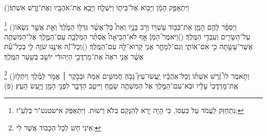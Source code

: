 \documentclass[12pt, openany]{book}
\newcommand{\footnotecomment}[1]{
	\renewcommand\thefootnote{}
	\footnote{\textsf{#1}}}
\newcommand{\commenta}[1]{\footnotecomment{#1}\hspace{0em}}
\newcommand{\vsnum}[1]{(\hebrewnumeral{#1})\space}
\begin{document}
{\vsnum{10}וַיִּתְאַפַּ֣ק הָמָ֔ן וַיָּב֖וֹא אֶל־בֵּית֑וֹ וַיִּשְׁלַ֛ח וַיָּבֵ֥א אֶת־אֹהֲבָ֖יו וְאֶת־זֶ֥רֶשׁ אִשְׁתּֽוֹ׃%
\commenta{ נִתְחַזֵּק לַעֲמֹד עַל כַּעְסוֹ, כִּי הָיָה יָרֵא לְהִנָּקֵם בְּלֹא רְשׁוּת. וַיִּתְאַפַּק אישטנט"ר בְּלַעַ"ז: }%
\vsnum{11}וַיְסַפֵּ֨ר לָהֶ֥ם הָמָ֛ן אֶת־כְּב֥וֹד עָשְׁר֖וֹ וְרֹ֣ב בָּנָ֑יו וְאֵת֩ כָּל־אֲשֶׁ֨ר גִּדְּל֤וֹ הַמֶּ֙לֶךְ֙ וְאֵ֣ת אֲשֶׁ֣ר נִשְּׂא֔וֹ עַל־הַשָּׂרִ֖ים וְעַבְדֵ֥י הַמֶּֽלֶךְ׃
\vsnum{12}וַיֹּאמֶר֮ הָמָן֒ אַ֣ף לֹא־הֵבִיאָה֩ אֶסְתֵּ֨ר הַמַּלְכָּ֧ה עִם־הַמֶּ֛לֶךְ אֶל־הַמִּשְׁתֶּ֥ה אֲשֶׁר־עָשָׂ֖תָה כִּ֣י אִם־אוֹתִ֑י וְגַם־לְמָחָ֛ר אֲנִ֥י קָֽרוּא־לָ֖הּ עִם־הַמֶּֽלֶךְ׃
\vsnum{13}וְכָל־זֶ֕ה אֵינֶ֥נּוּ שֹׁוֶ֖ה לִ֑י בְּכָל־עֵ֗ת אֲשֶׁ֨ר אֲנִ֤י רֹאֶה֙ אֶת־מָרְדֳּכַ֣י הַיְּהוּדִ֔י יוֹשֵׁ֖ב בְּשַׁ֥עַר הַמֶּֽלֶךְ׃%
\commenta{ אֵינִי חָשׁ לְכָל הַכָּבוֹד אֲשֶׁר לִי:}%
\vsnum{14}וַתֹּ֣אמֶר לוֹ֩ זֶ֨רֶשׁ אִשְׁתּ֜וֹ וְכָל־אֹֽהֲבָ֗יו יַֽעֲשׂוּ־עֵץ֮ גָּבֹ֣הַּ חֲמִשִּׁ֣ים אַמָּה֒ וּבַבֹּ֣קֶר ׀ אֱמֹ֣ר לַמֶּ֗לֶךְ וְיִתְל֤וּ אֶֽת־מָרְדֳּכַי֙ עָלָ֔יו וּבֹֽא־עִם־הַמֶּ֥לֶךְ אֶל הַמִּשְׁתֶּ֖ה שָׂמֵ֑חַ וַיִּיטַ֧ב הַדָּבָ֛ר לִפְנֵ֥י הָמָ֖ן וַיַּ֥עַשׂ הָעֵֽץ׃ (פ)
\clearpage}
\end{document}
